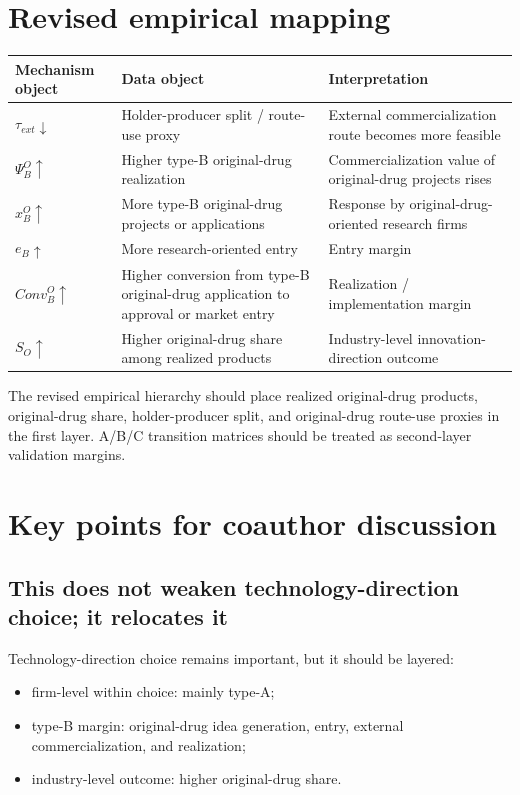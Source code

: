 \documentclass[12pt]{article}
\begin{document}
\section{Revised empirical mapping}

\begin{table}[h!]
\centering
\small
\begin{tabularx}{\textwidth}{p{}p{}Y}
\toprule
Mechanism object & Data object & Interpretation \\
\midrule
$\tau_{ext}\downarrow$ & Holder-producer split / route-use proxy & External commercialization route becomes more feasible \\
$\Psi_B^O\uparrow$ & Higher type-B original-drug realization & Commercialization value of original-drug projects rises \\
$x_B^O\uparrow$ & More type-B original-drug projects or applications & Response by original-drug-oriented research firms \\
$e_B\uparrow$ & More research-oriented entry & Entry margin \\
$Conv_B^O\uparrow$ & Higher conversion from type-B original-drug application to approval or market entry & Realization / implementation margin \\
$S_O\uparrow$ & Higher original-drug share among realized products & Industry-level innovation-direction outcome \\
\bottomrule
\end{tabularx}
\end{table}

The revised empirical hierarchy should place realized original-drug products, original-drug share, holder-producer split, and original-drug route-use proxies in the first layer. A/B/C transition matrices should be treated as second-layer validation margins.

\section{Key points for coauthor discussion}

\subsection{This does not weaken technology-direction choice; it relocates it}

Technology-direction choice remains important, but it should be layered:
\begin{itemize}
    \item firm-level within choice: mainly type-A;
    \item type-B margin: original-drug idea generation, entry, external commercialization, and realization;
    \item industry-level outcome: higher original-drug share.
\end{itemize}
\end{document}
